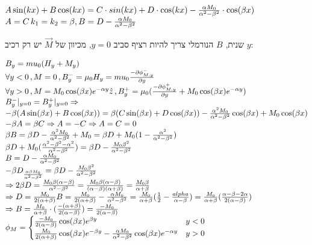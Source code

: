 \documentclass[14pt]{extarticle}
\makeatletter
\newenvironment{lefteqs}{%
    \begin{english}%
    \begin{flushleft}%
    \renewcommand{\arraystretch}{1.3}%
    $\begin{array}{@{}l@{}}%
}{%
    \end{array}$%
    \end{flushleft}%
    \end{english}%
}
\makeatother
\begin{document}
\begin{lefteqs}
    A\sin(kx) + B\cos(kx) = C\cdot sin(kx) + D\cdot \cos(kx) -\frac{\alpha M_0}{\alpha^2 - \beta^2}\cdot \cos(\beta x) \\
    A = C \, k_1 = k_2 = \beta, B=D-\frac{\alpha M_0}{\alpha^2 - \beta^2} \\
\end{lefteqs}
שנית, $B$ הנורמלי צריך להיות רציף סביב $y=0$, מכיוון של $\vec{M}$ יש רק רכיב $y$:

\begin{lefteqs}
    B_y = mu_0 (H_y + M_y) \\
    \forall y<0 \, , M = 0 \, , B_y^- = \mu_0 H_y = mu_0 \frac{-\partial \phi_{M,y}^-}{\partial y} \\
    \forall y>0 \, , M = M_0 \cos(\beta x) e^{-\alpha y} \hat{z} \, , B_y^+ = \mu_0 (\frac{-\partial \phi_{M,y}^+}{\partial y} + M_0 \cos(\beta x)e^{-\alpha y}) \\
    B_y^-|_{y=0} = B_y^+|_{y=0} \Rightarrow \\
    -\beta(A\sin(\beta x) + B\cos(\beta x)) = \beta(C\sin(\beta x) + D\cos(\beta x)) - \frac{\alpha^2 M_0}{\alpha^2-\beta^2}\cos(\beta x) + M_0\cos(\beta x) \\
    -\beta A=\beta C \Rightarrow A=-C \Rightarrow A=C=0 \\
    \beta B = \beta D - \frac{\alpha^2 M_0}{\alpha^2 - \beta^2} + M_0 = \beta D + M_0 (1-\frac{\alpha^2}{\alpha^2 - \beta^2}) \\
    \beta D + M_0 (\frac{\alpha^2 - \beta^2 -\alpha^2}{\alpha^2 - \beta^2}) = \beta D - \frac{M_0 \beta^2}{\alpha^2 - \beta^2} \\
    B=D-\frac{\alpha M_0}{\alpha^2 - \beta^2}\\
    -\beta D _ \frac{\alpha \beta M_0}{\alpha^2 - \beta^2} = \beta D - \frac{M_0 \beta^2}{\alpha^2 - \beta^2} \\
    \Rightarrow 2\beta D = \frac{M_0 \beta (\alpha - \beta)}{\alpha^2 - \beta^2} = \frac{M_0 \beta(\alpha - \beta)}{(\alpha - \beta)(\alpha + \beta)} = \frac{M_0 \beta}{\alpha + \beta} \\
    \Rightarrow D = \frac{M_0}{2(\alpha + \beta)}
    B = \frac{M_0}{2(\alpha + \beta)} - \frac{\alpha M_0}{\alpha^2 -\beta^2} = \frac{M_0}{\alpha+\beta}(\frac{1}{2} - \frac{alpha}{\alpha-\beta}) = \frac{M_0}{\alpha + \beta}(\frac{\alpha-\beta-2\alpha}{2(\alpha-\beta)}) \\
    \Rightarrow B=\frac{M_0}{\alpha+\beta} \cdot (\frac{-(\alpha+\beta)}{2(\alpha-\beta)}) = \frac{-M_0}{2(\alpha-\beta)} \\
    \phi_M = \begin{cases}
    \frac{-M_0}{2(\alpha-\beta)} \cos(\beta x) e^{\beta y} & y<0 \\
    \frac{M_0}{2(\alpha+\beta)} \cos(\beta x) e^{-\beta y} - \frac{\alpha M_0}{\alpha^2 - \beta^2} \cos(\beta x) e^{-\alpha y} & y>0
    \end{cases}
\end{lefteqs}
\end{document}
